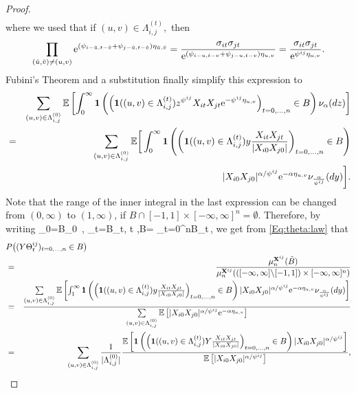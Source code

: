 \begin{proof}
\begin{eqnarray*}
\end{eqnarray*}
where we used that if $(u,v) \in \Lambda_{i,j}^{(t)},$ then 
$$ \prod_{(\tilde{u},\tilde{v}) \neq (u,v)}{\rm e}^{(\psi_{i-\tilde{u},t-\tilde{v}}+\psi_{j-\tilde{u},t-\tilde{v}})\eta_{\tilde{u},\tilde{v}}}= \frac{\sigma_{it}\sigma_{jt}}{{\rm e}^{(\psi_{i-u,t-v}+\psi_{j-u,t-v})\eta_{u,v}}}=\frac{\sigma_{it}\sigma_{jt}}{{\rm e}^{\psi^{ij}\eta_{u,v}}}. $$  
Fubini's Theorem and a substitution finally simplify this expression to 
\begin{eqnarray*}
&&
\sum_{(u,v) \in \Lambda_{i,j}^{(0)}}{\mathbb E}\left[\int_0^\infty \mathbf{1}\left(\left(\mathbf{1}((u,v) \in \Lambda_{i,j}^{(t)})z^{\psi^{ij}}X_{it}X_{jt}{\rm e}^{-\psi^{ij}\eta_{u,v}}\right)_{t=0, \ldots, n} \in B\right)\nu_\alpha(dz)\right]  \\
&=&
\sum_{(u,v) \in \Lambda_{i,j}^{(0)}}{\mathbb E}\bigg[\int_0^\infty \mathbf{1}\left(\left(\mathbf{1}((u,v) \in \Lambda_{i,j}^{(t)})y \frac{X_{it}X_{jt}}{|X_{i0}X_{j0}|}\right)_{t=0, \ldots, n} \in B\right) \\
&&
|X_{i0}X_{j0}|^{\alpha/\psi^{ij}}{\rm e}^{-\alpha \eta_{u,v}}\nu_{\frac{\alpha}{\psi^{ij}}}(dy)\bigg].
\end{eqnarray*}
Note that the range of the inner integral in the last expression can be changed 
from $(0, \infty)$ to $(1,\infty)$, if $B \cap [-1,1] \times [-\infty,\infty]^n = \emptyset$. 
Therefore, by writing
\beao
{}_0=B_0 \setminus [-1,1] \,, \quad {}_t=B_t, \quad t ,\quad \tilde B=
\times_{t=0}^n\tilde B_t\,,
\eeao 
we get from \eqref{Eq:theta:law} that
\begin{eqnarray*}
\lefteqn{P\big((Y \Theta^{ij}_t)_{t=0,\ldots,n} \in B\big)}\\&=&\frac{\mu^{\bfX^{ij}}_n(\tilde{B})}{\mu^{\bfX^{ij}}_n(
([-\infty,\infty]\backslash [-1,1])\times [-\infty,\infty]^n)}\\
&=& \frac{\sum\limits_{(u,v) \in \Lambda_{i,j}^{(0)}}\E\left[\int_1^\infty \I\left(\left(\I((u,v) \in \Lambda_{i,j}^{(t)})y \frac{X_{it}X_{jt}}{|X_{i0}X_{j0}|}\right)_{t=0, \ldots, n} \in B\right)|X_{i0}X_{j0}|^{\alpha/\psi^{ij}}\ex^{-\alpha \eta_{u,v}}\nu_{\frac{\alpha}{\psi^{ij}}}(dy)\right]}{\sum\limits_{(u,v) \in \Lambda_{i,j}^{(0)}}\E\left[|X_{i0}X_{j0}|^{\alpha/\psi^{ij}}\ex^{-\alpha \eta_{u,v}}\right]} \\
&=& \sum\limits_{(u,v) \in \Lambda_{i,j}^{(0)}}\frac{1}{| \Lambda_{i,j}^{(0)}|}\frac{\E\left[\I\left(\left(\I((u,v) \in \Lambda_{i,j}^{(t)})Y \frac{X_{it}X_{jt}}{|X_{i0}X_{j0}|}\right)_{t=0, \ldots, n} \in B\right)|X_{i0}X_{j0}|^{\alpha/\psi^{ij}}\right]}{\E\left[|X_{i0}X_{j0}|^{\alpha/\psi^{ij}}\right]},

\end{eqnarray*}
\end{proof}
